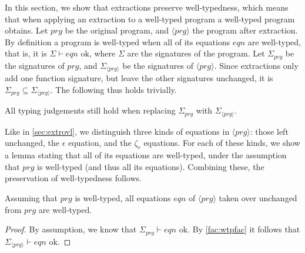 In this section, we show that extractions preserve well-typedness, which means that when applying an extraction to a well-typed program a well-typed program obtains. Let $prg$ be the original program, and $\langle prg \rangle$ the program after extraction. By definition a program is well-typed when all of its equations $eqn$ are well-typed, that is, it is $\Sigma \vdash eqn \textrm{ ok}$, where $\Sigma$ are the signatures of the program. Let $\Sigma_{prg}$ be the signatures of $prg$, and $\Sigma_{\langle prg \rangle}$ be the signatures of $\langle prg \rangle$. Since extractions only add one function signature, but leave the other signatures unchanged, it is $\Sigma_{prg} \subseteq \Sigma_{\langle prg \rangle}$. The following thus holds trivially.

\begin{fact}
\label{fac:wtpfac}
All typing judgements still hold when replacing $\Sigma_{prg}$ with $\Sigma_{\langle prg \rangle}$.
\end{fact}

Like in \autoref{sec:extrovl}, we distinguish three kinds of equations in $\langle prg \rangle$: those left unchanged, the $\epsilon$ equation, and the $\zeta_r$ equations. For each of these kinds, we show a lemma stating that all of its equations are well-typed, under the assumption that $prg$  is well-typed (and thus all its equations). Combining these, the preservation of well-typedness follows.

\begin{lemma}
Assuming that $prg$ is well-typed, all equations $eqn$ of $\langle prg \rangle$ taken over unchanged from $prg$ are well-typed.

\begin{proof}
By assumption, we know that $\Sigma_{prg} \vdash eqn \textrm{ ok}$. By \autoref{fac:wtpfac} it follows that $\Sigma_{\langle prg \rangle} \vdash eqn \textrm{ ok}$.
\end{proof}
\end{lemma}

